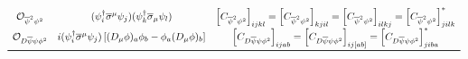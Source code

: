 \begin{table}[tbp]
\begin{align*}
{\begin{array}[t]{cccc}
\mathcal{O}_{\overline \psi^2 \psi^2} & (\psi_i^\dagger \overline \sigma^\mu \psi_j)(\psi_k^\dagger \overline \sigma_\mu \psi_l) & \left[C_{\overline \psi^2 \psi^2}\right]_{ijkl} = \left[C_{\overline \psi^2 \psi^2}\right]_{kjil} = \left[C_{\overline \psi^2 \psi^2}\right]_{ilkj} = \left[C_{\overline \psi^2 \psi^2}\right]_{jilk}^*\\
 \mathcal{O}_{D\overline \psi \psi \phi^2} & i(\psi^\dagger_i \overline \sigma^\mu \psi_j)\left[(D_\mu \phi)_a \phi_b - \phi_a (D_\mu \phi)_b\right] & \left[C_{D\overline \psi \psi \phi^2}\right]_{ijab} = \left[C_{D\overline \psi \psi \phi^2}\right]_{ij[ab]} = \left[C_{D\overline \psi \psi \phi^2}\right]_{jiba}^*\\
\bottomrule
%
\end{array}
}
\end{align*}
\caption{Dimension-six bosonic and fermionic operators of the general EFT, together with the symmetry properties of the associated Wilson coefficients.}
\label{tab:dim6gen}
\end{table}
